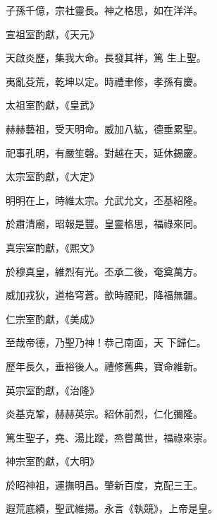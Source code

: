 \begin{pinyinscope}
 子孫千億，宗社靈長。神之格思，如在洋洋。



 宣祖室酌獻，《天元》



 天啟炎歷，集我大命。長發其祥，篤
 生上聖。



 夷亂芟荒，乾坤以定。時禮聿修，孝孫有慶。



 太祖室酌獻，《皇武》



 赫赫藝祖，受天明命。威加八紘，德垂累聖。



 祀事孔明，有嚴笙磬。對越在天，延休錫慶。



 太宗室酌獻，《大定》



 明明在上，時維太宗。允武允文，丕基紹隆。



 於肅清廟，昭報是豐。皇靈格思，福祿來同。



 真宗室酌獻，《熙文》



 於穆真皇，維烈有光。丕承二後，奄奠萬方。



 威加戎狄，道格穹蒼。歆時禋祀，降福無疆。



 仁宗室酌獻，《美成》



 至哉帝德，乃聖乃神！恭己南面，天
 下歸仁。



 歷年長久，垂裕後人。禮修舊典，寶命維新。



 英宗室酌獻，《治隆》



 炎基克鞏，赫赫英宗。紹休前烈，仁化彌隆。



 篤生聖子，堯、湯比蹤，烝嘗萬世，福祿來崇。



 神宗室酌獻，《大明》



 於昭神祖，運撫明昌。肇新百度，克配三王。



 遐荒底績，聖武維揚。永言《執競》，上帝是皇。




\end{pinyinscope}
